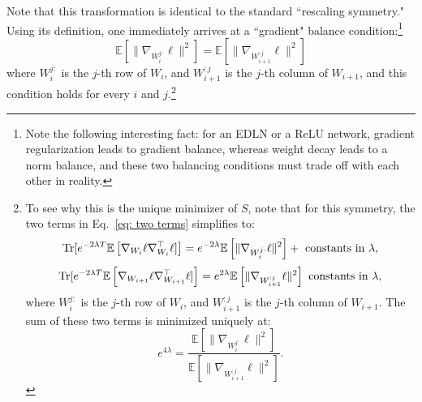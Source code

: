 \documentclass[11pt]{article}
\theoremstyle{plain}
\newcommand{\E}{\mathbb{E}}
\newcommand{\Tr}{{\rm Tr}}
\begin{document}
Note that this transformation is identical to the standard ``rescaling symmetry." Using its definition, one immediately arrives at a ``gradient" balance condition:\footnote{Note the following interesting fact: for an EDLN or a ReLU network, gradient regularization leads to gradient balance, whereas weight decay leads to a norm balance, and these two balancing conditions must trade off with each other in reality.}
\begin{equation}\label{eq: diagonal gradients}
     {\E\left[ \|\nabla_{W_i^{j:}}\ell \|^2\right]} = {\E\left[ \|\nabla_{W_{i+1}^{:j}}\ell \|^2\right]}
\end{equation}
where $W_i^{j:}$ is the $j$-th row of $W_i$, and $W_{i+1}^{:j}$ is the $j$-th column of $W_{i+1}$, and this condition holds for every $i$ and $j$.\footnote{To see why this is the unique minimizer of $S$, note that for this symmetry, the two terms in Eq.~\eqref{eq: two terms} simplifies to:
\begin{equation}
     \Tr[ e^{-2\lambda T}\E\left[\nabla_{W_i}\ell \nabla_{W_i}^\top\ell] \right] = e^{-2\lambda} \E\left[ \|\nabla_{W_i^{j:}}\ell \|^2\right] + \text{ constants in $\lambda$},
\end{equation}
\begin{equation}
     \Tr[ e^{-2\lambda T}\E\left[\nabla_{W_{i+1}}\ell \nabla_{W_{i+1}}^\top\ell] \right] = e^{2\lambda} \E\left[ \|\nabla_{W_{i+1}^{:j}}\ell \|^2\right] \text{ constants in $\lambda$},
\end{equation}
where $W_i^{j:}$ is the $j$-th row of $W_i$, and $W_{i+1}^{:j}$ is the $j$-th column of $W_{i+1}$. The sum of these two terms is minimized uniquely at:
\begin{equation}
    e^{4\lambda}  =  \frac{\E\left[ \|\nabla_{W_i^{j:}}\ell \|^2\right]}{\E\left[ \|\nabla_{W_{i+1}^{:j}}\ell \|^2\right]}.
\end{equation}}
\end{document}
